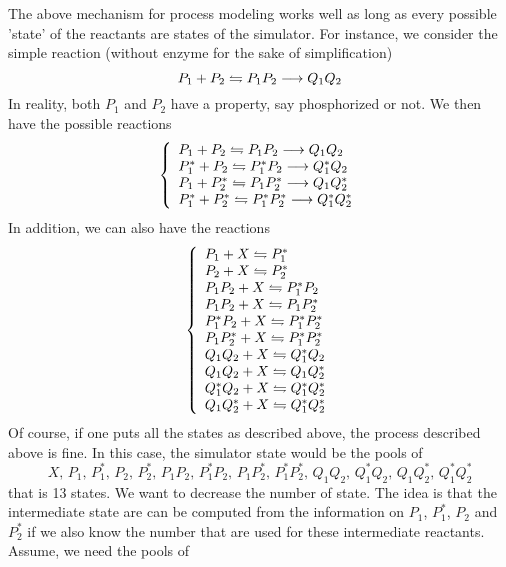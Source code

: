 The above mechanism for process modeling works well as long as every possible 'state' of the reactants are states of the simulator. For instance, we consider the simple reaction (without enzyme for the sake of simplification)
$$
  P_1+P_2 \stackrel{}{\leftrightharpoons} P_1P_2 \longrightarrow Q_1Q_2
$$
In reality, both $P_1$ and $P_2$ have a property, say phosphorized or not. We then have the possible reactions
$$
  \left\{
    \begin{array}{l}
      P_1+P_2 \stackrel{}{\leftrightharpoons} P_1P_2 \longrightarrow Q_1Q_2 \\
      P_1^*+P_2 \stackrel{}{\leftrightharpoons} P_1^*P_2 \longrightarrow Q_1^*Q_2 \\
      P_1+P_2^* \stackrel{}{\leftrightharpoons} P_1P_2^* \longrightarrow Q_1Q_2^* \\
      P_1^*+P_2^* \stackrel{}{\leftrightharpoons} P_1^*P_2^* \longrightarrow Q_1^*Q_2^* \\
    \end{array}
  \right.
$$
In addition, we can also have the reactions
$$
  \left\{
    \begin{array}{l}
      P_1 + X \stackrel{}{\leftrightharpoons} P_1^* \\
      P_2 + X \stackrel{}{\leftrightharpoons} P_2^* \\
      P_1P_2 + X \stackrel{}{\leftrightharpoons} P_1^*P_2 \\
      P_1P_2 + X \stackrel{}{\leftrightharpoons} P_1P_2^* \\
      P_1^*P_2 + X \stackrel{}{\leftrightharpoons} P_1^*P_2^* \\
      P_1P_2^* + X \stackrel{}{\leftrightharpoons} P_1^*P_2^* \\
      Q_1Q_2 + X \stackrel{}{\leftrightharpoons} Q_1^*Q_2 \\
      Q_1Q_2 + X \stackrel{}{\leftrightharpoons} Q_1Q_2^* \\
      Q_1^*Q_2 + X \stackrel{}{\leftrightharpoons} Q_1^*Q_2^* \\
      Q_1Q_2^* + X \stackrel{}{\leftrightharpoons} Q_1^*Q_2^* \\
    \end{array}
  \right.
$$
Of course, if one puts all the states as described above, the process described above is fine. In this case, the simulator state would be the pools of
$$
  X,\,P_1,\,P_1^*,\,P_2,\,P_2^*,\,P_1P_2,\,P_1^*P_2,\,P_1P_2^*,\,P_1^*P_2^*,\,Q_1Q_2,\,Q_1^*Q_2,\,Q_1Q_2^*,\,Q_1^*Q_2^*
$$
that is 13 states. We want to decrease the number of state. The idea is that the intermediate state are can be computed from the information on $P_1$, $P_1^*$, $P_2$ and $P_2^*$ if we also know the number that are used for these intermediate reactants. Assume, we need the pools of
